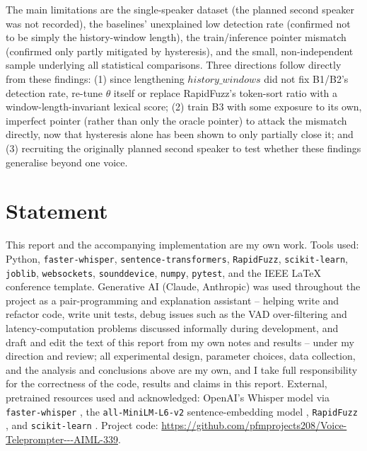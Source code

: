 \documentclass[conference,a4paper]{IEEEtran}
\begin{document}
The main limitations are the single-speaker dataset (the planned second speaker was not recorded), the baselines' unexplained low detection rate (confirmed not to be simply the history-window length), the train/inference pointer mismatch (confirmed only partly mitigated by hysteresis), and the small, non-independent sample underlying all statistical comparisons. Three directions follow directly from these findings: (1) since lengthening \(history\_windows\) did not fix B1/B2's detection rate, re-tune \(\theta\) itself or replace RapidFuzz's token-sort ratio with a window-length-invariant lexical score; (2) train B3 with some exposure to its own, imperfect pointer (rather than only the oracle pointer) to attack the mismatch directly, now that hysteresis alone has been shown to only partially close it; and (3) recruiting the originally planned second speaker to test whether these findings generalise beyond one voice.

\section*{Statement}
This report and the accompanying implementation are my own work. Tools used: Python, \texttt{faster-whisper}, \texttt{sentence-transformers}, \texttt{RapidFuzz}, \texttt{scikit-learn}, \texttt{joblib}, \texttt{websockets}, \texttt{sounddevice}, \texttt{numpy}, \texttt{pytest}, and the IEEE \LaTeX{} conference template. Generative AI (Claude, Anthropic) was used throughout the project as a pair-programming and explanation assistant -- helping write and refactor code, write unit tests, debug issues such as the VAD over-filtering and latency-computation problems discussed informally during development, and draft and edit the text of this report from my own notes and results -- under my direction and review; all experimental design, parameter choices, data collection, and the analysis and conclusions above are my own, and I take full responsibility for the correctness of the code, results and claims in this report. External, pretrained resources used and acknowledged: OpenAI's Whisper model via \texttt{faster-whisper} \cite{b1,b6}, the \texttt{all-MiniLM-L6-v2} sentence-embedding model \cite{b2}, \texttt{RapidFuzz} \cite{b5}, and \texttt{scikit-learn} \cite{b4}. Project code: \url{https://github.com/pfmprojects208/Voice-Teleprompter---AIML-339}.
\end{document}
